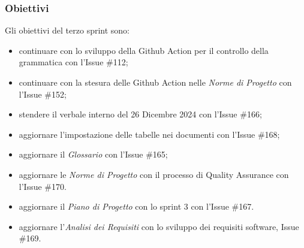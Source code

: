 \subsubsection{Obiettivi}
Gli obiettivi del terzo sprint sono:
\begin{itemize}
    \item continuare con lo sviluppo della Github Action per il controllo della grammatica con l'Issue \#112;
    \item continuare con la stesura delle Github Action nelle \textit{Norme di Progetto} con l'Issue \#152;
    \item stendere il verbale interno del 26 Dicembre 2024 con l'Issue \#166;
    \item aggiornare l'impostazione delle tabelle nei documenti con l'Issue \#168;
    \item aggiornare il \textit{Glossario} con l'Issue \#165;
    \item aggiornare le \textit{Norme di Progetto} con il processo di Quality Assurance con l'Issue \#170.
    \item aggiornare il \textit{Piano di Progetto} con lo sprint 3 con l'Issue \#167.
    \item aggiornare l'\textit{Analisi dei Requisiti} con lo sviluppo dei requisiti software, Issue \#169.
\end{itemize}